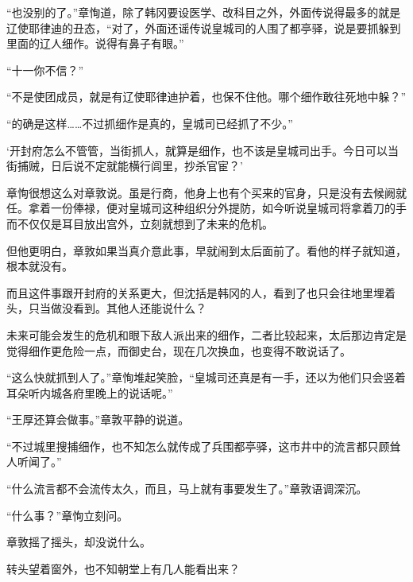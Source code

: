 “也没别的了。”章恂道，除了韩冈要设医学、改科目之外，外面传说得最多的就是辽使耶律迪的丑态，“对了，外面还谣传说皇城司的人围了都亭驿，说是要抓躲到里面的辽人细作。说得有鼻子有眼。”

“十一你不信？”

“不是使团成员，就是有辽使耶律迪护着，也保不住他。哪个细作敢往死地中躲？”

“的确是这样……不过抓细作是真的，皇城司已经抓了不少。”

‘开封府怎么不管管，当街抓人，就算是细作，也不该是皇城司出手。今日可以当街捕贼，日后说不定就能横行闾里，抄杀官宦？’

章恂很想这么对章敦说。虽是行商，他身上也有个买来的官身，只是没有去候阙就任。拿着一份俸禄，便对皇城司这种组织分外提防，如今听说皇城司将拿着刀的手而不仅仅是耳目放出宫外，立刻就想到了未来的危机。

但他更明白，章敦如果当真介意此事，早就闹到太后面前了。看他的样子就知道，根本就没有。

而且这件事跟开封府的关系更大，但沈括是韩冈的人，看到了也只会往地里埋着头，只当做没看到。其他人还能说什么？

未来可能会发生的危机和眼下敌人派出来的细作，二者比较起来，太后那边肯定是觉得细作更危险一点，而御史台，现在几次换血，也变得不敢说话了。

“这么快就抓到人了。”章恂堆起笑脸，“皇城司还真是有一手，还以为他们只会竖着耳朵听内城各府里晚上的说话呢。”

“王厚还算会做事。”章敦平静的说道。

“不过城里搜捕细作，也不知怎么就传成了兵围都亭驿，这市井中的流言都只顾耸人听闻了。”

“什么流言都不会流传太久，而且，马上就有事要发生了。”章敦语调深沉。

“什么事？”章恂立刻问。

章敦摇了摇头，却没说什么。

转头望着窗外，也不知朝堂上有几人能看出来？

